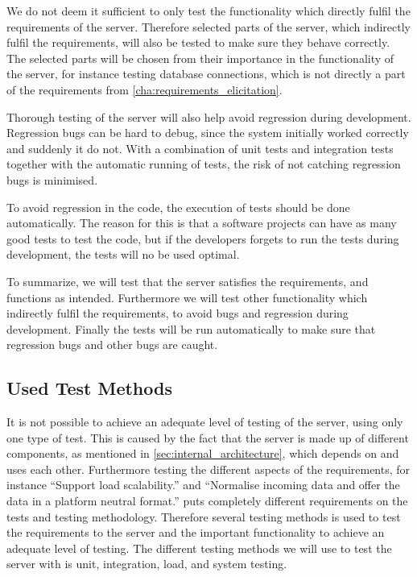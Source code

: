 We do not deem it sufficient to only test the functionality which directly fulfil the requirements of the server.
Therefore selected parts of the server, which indirectly fulfil the requirements, 
will also be tested to make sure they behave correctly.
The selected parts will be chosen from their importance in the functionality of the server,
for instance testing database connections, 
which is not directly a part of the requirements from \cref{cha:requirements_elicitation}.


Thorough testing of the server will also help avoid regression during development.
Regression bugs can be hard to debug, since the system initially worked correctly and suddenly it do not.
With a combination of unit tests and integration tests together with the automatic running of tests,
the risk of not catching regression bugs is minimised\cite{regression}.

To avoid regression in the code, the execution of tests should be done automatically.
The reason for this is that a software projects can have as many good tests to test the code,
but if the developers forgets to run the tests during development,
the tests will no be used optimal.

\bigskip
To summarize, we will test that the server satisfies the requirements,
and functions as intended. 
Furthermore we will test other functionality which indirectly fulfil the requirements,
to avoid bugs and regression during development.
Finally the tests will be run automatically to make sure that regression bugs and other bugs are caught.

\subsection{Used Test Methods}
It is not possible to achieve an adequate level of testing of the server, using only one type of test.
This is caused by the fact that the server is made up of different components, 
as mentioned in \cref{sec:internal_architecture}, 
which depends on and uses each other.
Furthermore testing the different aspects of the requirements, for instance ``Support load scalability.'' 
and ``Normalise incoming data and offer the data in a platform neutral format.'' puts completely different
requirements on the tests and testing methodology.
Therefore several testing methods is used to test the requirements to the server 
and the important functionality to achieve an adequate level of testing.
The different testing methods we will use to test the server with is unit, integration, load, and system testing.

